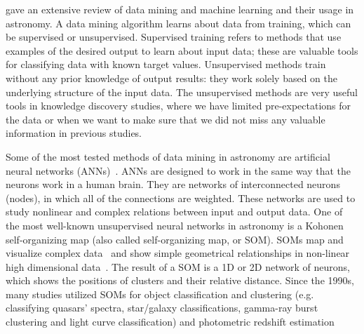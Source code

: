 \cite{Ball10} gave an extensive review of data mining and machine learning and their usage in astronomy.
A data mining algorithm learns about data from training, which can be supervised or unsupervised.
Supervised training refers to methods that use examples of the desired output to learn about input data; these are valuable tools for classifying data with known target values.
Unsupervised methods train without any prior knowledge of output results: 
they work solely based on the underlying structure of the input data.   
The unsupervised methods are very useful tools in knowledge discovery studies, where we have limited pre-expectations for the data or when we want to make sure that we did not miss any valuable information in  previous studies. %

Some of the most tested methods of data mining in astronomy are artificial neural networks (ANNs)~\citep[e.g.][and references therein]{ Hossein14,Hossein16}.
ANNs are designed to work in the same way that the neurons work in a human brain.
They are networks of interconnected neurons (nodes), in which all of the connections are weighted.
These networks are used to study nonlinear and complex relations between input and output data.
One of the most well-known unsupervised neural networks in astronomy is a Kohonen self-organizing map (also called self-organizing map, or SOM).
SOMs map and visualize complex data~\citep{Kohonen82} and show simple geometrical relationships in non-linear high dimensional data~\citep{Kohonen98}.
The result of a SOM is a 1D or 2D network of neurons, which shows the positions of clusters and their relative distance.
Since the 1990s, many studies utilized SOMs for object classification and clustering (e.g. classifying quasars' spectra, star/galaxy classifications, gamma-ray burst clustering and light curve classification) and photometric redshift estimation~\citep[e.g.][]{Odewahn92, Hernandez94, Murtagh95, Maehoenen95,Scaringi09,Geach12,Fustes13,Meusinger16,Rahmani16b} %

